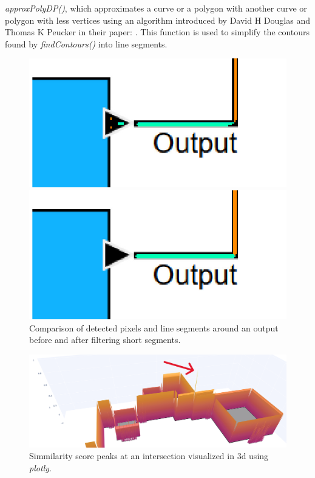 \textit{approxPolyDP()}, which approximates a curve or a polygon with another curve or polygon with less vertices using an algorithm introduced by David H Douglas and Thomas K Peucker in their paper: \cite{douglas_peucker_1973}. This function is used to simplify the contours found by \textit{findContours()} into line segments.
\begin{figure}[ht]
  \centering
  \begin{minipage}[b]{0.45\textwidth}
    \includegraphics[width=\textwidth]{pictures/thresh_zoom.png}
  \end{minipage}
  \hfill
  \begin{minipage}[b]{0.45\textwidth}
    \includegraphics[width=\textwidth]{pictures/line_segments_zoom.png}
  \end{minipage}
  \caption{Comparison of detected pixels and line segments around an output before and after filtering short segments.}
  \label{fig:comparison_filter}
\end{figure}
\begin{figure}[ht]
    \centering
    \includegraphics[width=1\linewidth]{pictures/intersection_peak.png}
    \caption{Simmilarity score peaks at an intersection visualized in 3d using \textit{plotly}.}
    \label{fig:intersection_peak}
\end{figure}\\
